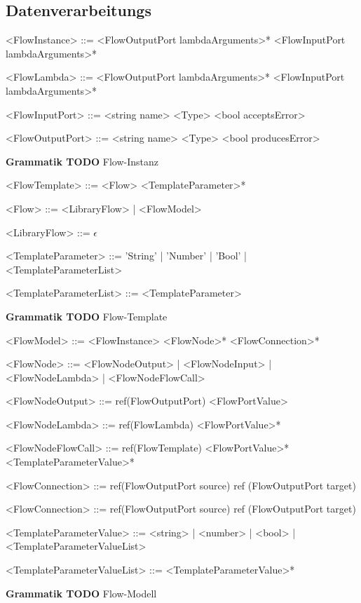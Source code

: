 \documentclass{article}
\begin{document}
    \subsection{Datenverarbeitungs}
    \begin{grammar}
        <FlowInstance> ::= <FlowOutputPort lambdaArguments>* <FlowInputPort lambdaArguments>*
        
        <FlowLambda> ::= <FlowOutputPort lambdaArguments>* <FlowInputPort lambdaArguments>*

        <FlowInputPort> ::= <string name> <Type> <bool acceptsError>

        <FlowOutputPort> ::= <string name> <Type> <bool producesError>
    \end{grammar}
    \textbf{Grammatik TODO} Flow-Instanz
    \begin{grammar}
        <FlowTemplate> ::= <Flow> <TemplateParameter>*

        <Flow> ::= <LibraryFlow> | <FlowModel>
        
        <LibraryFlow> ::= $\epsilon$

        <TemplateParameter> ::= 'String' | 'Number' | 'Bool' | <TemplateParameterList>
        
        <TemplateParameterList> ::= <TemplateParameter>
    \end{grammar}
    \textbf{Grammatik TODO} Flow-Template
    \begin{grammar}
        <FlowModel> ::= <FlowInstance> <FlowNode>* <FlowConnection>*

        <FlowNode> ::= <FlowNodeOutput> | <FlowNodeInput> | <FlowNodeLambda> | <FlowNodeFlowCall>
       
        <FlowNodeOutput> ::= ref(FlowOutputPort) <FlowPortValue>

        <FlowNodeLambda> ::= ref(FlowLambda) <FlowPortValue>*

        <FlowNodeFlowCall> ::= ref(FlowTemplate) <FlowPortValue>* <TemplateParameterValue>*
    
        <FlowConnection> ::= ref(FlowOutputPort source) ref (FlowOutputPort target)
    
        <FlowConnection> ::= ref(FlowOutputPort source) ref (FlowOutputPort target)
    
        <TemplateParameterValue> ::= <string> | <number> | <bool> | <TemplateParameterValueList>
    
        <TemplateParameterValueList> ::= <TemplateParameterValue>*
    \end{grammar}
    \textbf{Grammatik TODO} Flow-Modell
    \newpage
\end{document}
